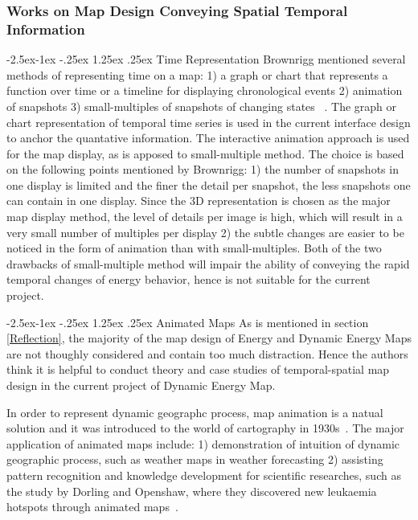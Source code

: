 \documentclass[hidelinks,12pt]{article}
\makeatletter
\renewcommand\paragraph{\@startsection{paragraph}{4}{\z@}%
            {-2.5ex\@plus -1ex \@minus -.25ex}%
            {1.25ex \@plus .25ex}%
            {\normalfont\normalsize\bfseries}}
\makeatother
\begin{document}
\subsubsection{Works on Map Design Conveying Spatial Temporal
  Information}
\paragraph{Time Representation}
Brownrigg mentioned several methods of representing time on a map: 1)
a graph or chart that represents a function over time or a timeline
for displaying chronological events 2) animation of snapshots 3)
small-multiples of snapshots of changing states
~\cite{Brownrigg2005}. The graph or chart representation of temporal
time series is used in the current interface design to anchor the
quantative information. The interactive animation approach is used for
the map display, as is apposed to small-multiple method. The choice is
based on the following points mentioned by Brownrigg: 1) the number of
snapshots in one display is limited and the finer the detail per
snapshot, the less snapshots one can contain in one display. Since the
3D representation is chosen as the major map display method, the level
of details per image is high, which will result in a very small number
of multiples per display 2) the subtle changes are easier
to be noticed in the form of animation than with small-multiples. Both
of the two drawbacks of small-multiple method will impair the ability
of conveying the rapid temporal changes of energy behavior, hence is
not suitable for the current project.

\paragraph{Animated Maps}
As is mentioned in section \ref{Reflection}, the majority of the map
design of Energy and Dynamic Energy Maps are not thoughly considered
and contain too much distraction. Hence the authors think it is
helpful to conduct theory and case studies of temporal-spatial map
design in the current project of Dynamic Energy Map.

In order to represent dynamic geographc process, map animation is a
natual solution and it was introduced to the world of cartography in
1930s~\cite{Harrower2008}. The major application of animated maps
include: 1) demonstration of intuition of dynamic geographic process,
such as weather maps in weather forecasting 2) assisting pattern
recognition and knowledge development for scientific researches, such
as the study by Dorling and Openshaw, where they discovered new
leukaemia hotspots through animated maps~\cite{Dorling1992}.
\end{document}

